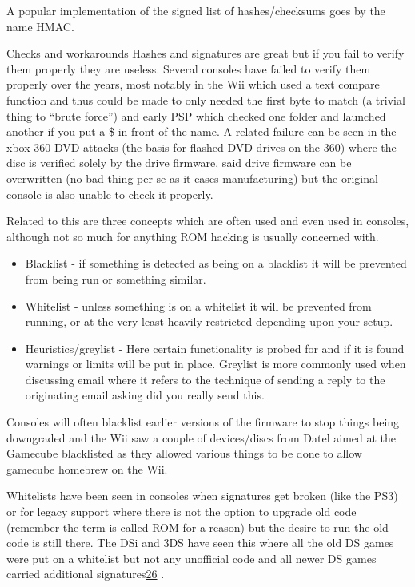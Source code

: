 \documentclass[
]{book}
\providecommand{\tightlist}{%
  \setlength{\itemsep}{0pt}\setlength{\parskip}{0pt}}
\begin{document}
A popular implementation of the signed list of hashes/checksums goes by the name HMAC.

Checks and workarounds Hashes and signatures are great but if you fail to verify them properly they are useless. Several consoles have failed to verify them properly over the years, most notably in the Wii which used a text compare function and thus could be made to only needed the first byte to match (a trivial thing to ``brute force'') and early PSP which checked one folder and launched another if you put a \$ in front of the name. A related failure can be seen in the xbox 360 DVD attacks (the basis for flashed DVD drives on the 360) where the disc is verified solely by the drive firmware, said drive firmware can be overwritten (no bad thing per se as it eases manufacturing) but the original console is also unable to check it properly.

Related to this are three concepts which are often used and even used in consoles, although not so much for anything ROM hacking is usually concerned with.

\begin{itemize}
\tightlist
\item
  Blacklist - if something is detected as being on a blacklist it will be prevented from being run or something similar.
\item
  Whitelist - unless something is on a whitelist it will be prevented from running, or at the very least heavily restricted depending upon your setup.
\item
  Heuristics/greylist - Here certain functionality is probed for and if it is found warnings or limits will be put in place. Greylist is more commonly used when discussing email where it refers to the technique of sending a reply to the originating email asking did you really send this.
\end{itemize}

Consoles will often blacklist earlier versions of the firmware to stop things being downgraded and the Wii saw a couple of devices/discs from Datel aimed at the Gamecube blacklisted as they allowed various things to be done to allow gamecube homebrew on the Wii.

Whitelists have been seen in consoles when signatures get broken (like the PS3) or for legacy support where there is not the option to upgrade old code (remember the term is called ROM for a reason) but the desire to run the old code is still there. The DSi and 3DS have seen this where all the old DS games were put on a whitelist but not any unofficial code and all newer DS games carried additional signatures\href{romhacking202027.html\#fn26x0}{26} .
\end{document}
